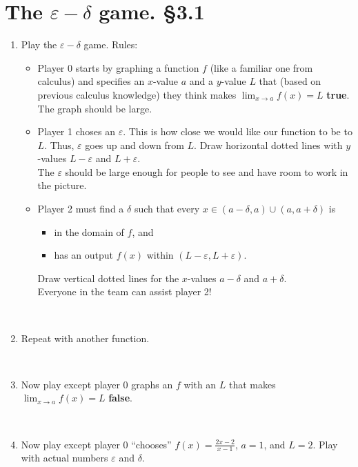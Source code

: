 \documentclass[12pt]{amsart}
\newcommand{\e}{\varepsilon}
\newcommand{\de}{\delta}
\newcommand{\ds}{\displaystyle}
\begin{document}
	
	\thispagestyle{empty}
	
	\section*{The $\e-\de$ game. \S 3.1}
	



\begin{enumerate}
\item Play the $\e-\de$ game. Rules:
\begin{itemize}
\item Player 0 starts by graphing a function $f$ (like a familiar one from calculus) and specifies an $x$-value $a$ and a $y$-value $L$ that (based on previous calculus knowledge) they think makes $\lim_{x\to a} f(x) = L$ \textbf{true}.\\
The graph should be large.
\item Player 1 choses an $\e$. This is how close we would like our function to be to $L$. Thus, $\e$ goes up and down from $L$. Draw horizontal dotted lines with $y$-values $L-\e$ and $L+\e$.\\
 The $\e$ should be large enough for people to see and have room to work in the picture.
\item Player 2 must find a $\de$ such that every $x \in (a-\de,a) \cup (a,a+\de)$ is 
\begin{itemize}
\item in the domain of $f$, and
\item has an output $f(x)$ within $(L-\e,L+\e)$.
\end{itemize}
Draw vertical dotted lines for the $x$-values $a-\de$ and $a+\de$.\\
Everyone in the team can assist player 2!
\end{itemize}

\

\item Repeat with another function.


\

\item Now play except player 0 graphs an $f$ with an $L$ that makes $\lim_{x\to a} f(x) = L$ \textbf{false}.

\

\item Now play except player 0 ``chooses'' $\ds f(x) = \frac{2x-2}{x-1}$, $a=1$, and $L=2$. Play with actual numbers $\e$ and $\de$.


\end{enumerate}
\end{document}

